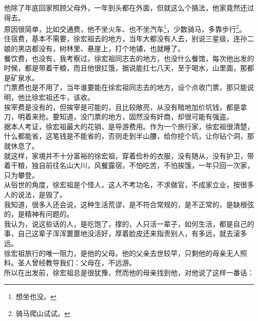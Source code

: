 \begin{multicols}{\theparacolNo}
他除了年底回家照顾父母外，一年到头都在外面，但就这么个搞法，他家竟然还过得去。\\

原因很简单，比如交通费，他不坐火车、也不坐汽车\footnote{想坐也没。}，少数骑马，多靠步行\footnote{骑马爬山试试。}。\\

住宿费，基本不需要，徐宏祖去的地方，当年大都没有人去，别说三星级，连孙二娘的黑店都没有，树林里、悬崖上，打个地铺，也就睡了。\\

餐饮费，也没有，我考察过，徐宏祖同志去的地方，也没什么餐馆，每次他出发的时候，都是带着干粮，而且他很扛饿，据说能扛七八天，至于喝水，山里面，那都是矿泉水。\\

门票费也是不用了，当年谁要能在徐宏祖同志去的地方，设个点收门票，那只能说明，他比徐宏祖还牛，该收。\\

挨宰费是没有的，但挨宰是可能的，且比较敞亮，从没有暗地加价坑钱，都是拿刀，明着来抢。要知道，没门票的地方，固然没有奸商，却很可能有强盗。\\

据本人考证，徐宏祖最大的花销，是导游费用。作为一个旅行家，徐宏祖很清楚，什么都能省，这笔钱是不能省的，否则走到半山腰，给你挖个坑，让你钻个洞，那就休息了。\\

就这样，家境并不十分富裕的徐宏祖，穿着俭朴的衣服，没有随从，没有护卫，带着干粮，独自前往名山大川，风餐露宿，不怕吃苦，不怕挨饿，一年只回一次家，只为攀登。\\

从俗世的角度，徐宏祖是个怪人，这人不考功名，不求做官，不成家立业，按很多人的说法，是毁了。\\

我知道，很多人还会说，这种生活荒谬，是不符合常规的，是不正常的，是缺根弦的，是精神有问题的。\\

我认为，说这些话的人，是吃饱了，撑的，人只活一辈子，如何生活，都是自己的事，自己这辈子浑浑噩噩地没活好，厚着脸皮还来指责别人，有多远，就去滚多远。\\

徐宏祖旅行的唯一阻力，是他的父母。他的父亲去世较早，只剩他的母亲无人照料。圣人曾经教导我们：父母在，不远游。\\

所以在出发前，徐宏祖总是很犹豫，然而他的母亲找到他，对他说了这样一番话：\\


\end{multicols}
